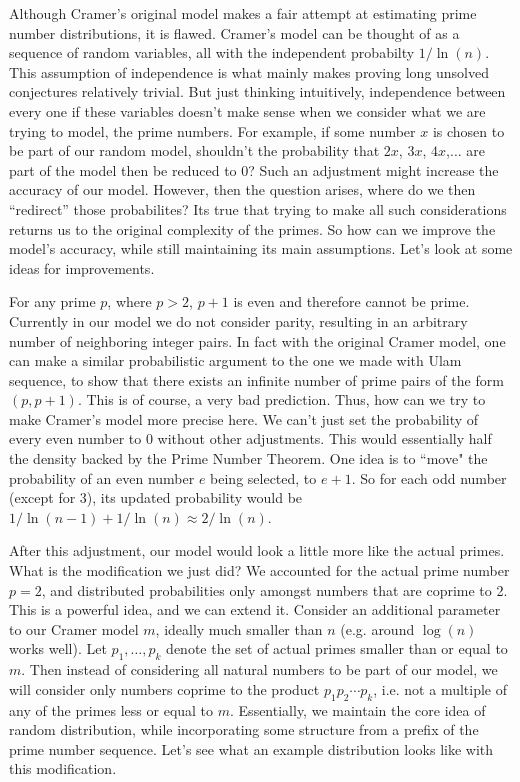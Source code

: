 \documentclass[conference]{IEEEtran}
\begin{document}
Although Cramer's original model makes a fair attempt at estimating prime number distributions, it is flawed. Cramer's model can be thought of as a sequence of random variables, all with the independent probabilty $1 / \ln(n)$. This assumption of independence is what mainly makes proving long unsolved conjectures relatively trivial. But just thinking intuitively, independence between every one if these variables doesn't make sense when we consider what we are trying to model, the prime numbers. For example, if some number $x$ is chosen to be part of our random model, shouldn't the probability that $2x$, $3x$, $4x$,$\dots$ are part of the model then be reduced to 0? Such an adjustment might increase the accuracy of our model. However, then the question arises, where do we then ``redirect'' those probabilites? Its true that trying to make all such considerations returns us to the original complexity of the primes. So how can we improve the model's accuracy, while still maintaining its main assumptions. Let's look at some ideas for improvements. 

For any prime $p$, where $p > 2$, $p + 1$ is even and therefore cannot be prime. Currently in our model we do not consider parity, resulting in an arbitrary number of neighboring integer pairs. In fact with the original Cramer model, one can make a similar probabilistic argument to the one we made with Ulam sequence, to show that there exists an infinite number of prime pairs of the form $(p, p + 1)$. This is of course, a very bad prediction. Thus, how can we try to make Cramer's model more precise here. We can't just set the probability of every even number to 0 without other adjustments. This would essentially half the density backed by the Prime Number Theorem. One idea is to ``move" the probability of an even number $e$ being selected, to $e + 1$. So for each odd number (except for 3), its updated probability would be $1 / \ln(n - 1) + 1 / \ln(n) \approx 2 / \ln(n)$.

After this adjustment, our model would look a little more like the actual primes. What is the modification we just did? We accounted for the actual prime number $p = 2$, and distributed probabilities only amongst numbers that are coprime to 2. This is a powerful idea, and we can extend it. Consider an additional parameter to our Cramer model $m$, ideally much smaller than $n$ (e.g. around $\log(n)$\cite{b1} works well). Let $p_1, \dots, p_k$ denote the set of actual primes smaller than or equal to $m$. Then instead of considering all natural numbers to be part of our model, we will consider only numbers coprime to the product $p_1p_2\cdots p_k$, i.e. not a multiple of any of the primes less or equal to $m$. Essentially, we maintain the core idea of random distribution, while incorporating some structure from a prefix of the prime number sequence. Let's see what an example distribution looks like with this modification.
\end{document}
